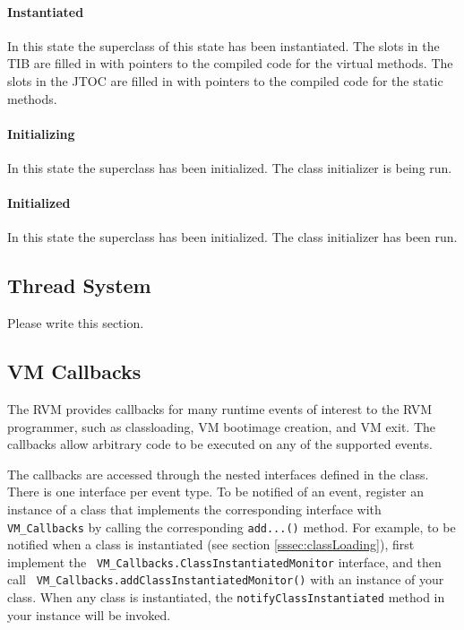 \paragraph{Instantiated}
In this state the superclass of this state has been instantiated. 
The slots in the TIB are filled in with pointers to the compiled code for the 
virtual methods. 
The slots in the JTOC are filled in with pointers to the compiled code for the 
static methods.

\paragraph{Initializing} 
In this state the superclass has been initialized. The class
initializer is being run. 

\paragraph{Initialized} 
In this state the superclass has been initialized. The class initializer has 
been run. 

\subsection{Thread System}\label{sec:threads}

Please write this section.

\subsection{VM Callbacks}\label{sssec:callbacks}

The RVM provides callbacks for many runtime events of interest to the RVM
programmer, such as classloading, VM bootimage creation, and VM exit.  The
callbacks allow arbitrary code to be executed on any of the supported events.

The callbacks are accessed through the nested interfaces defined in the 
class.  There is one interface per event type.  To be notified
of an event, register an instance of a class that implements the corresponding
interface with {\tt VM\_Callbacks} by calling the corresponding {\tt add...()}
method.  For example, to be notified when a class is instantiated (see section
\ref{sssec:classLoading}), first implement the {\tt
VM\_Callbacks.ClassInstantiatedMonitor} interface, and then call {\tt
VM\_Callbacks.addClassInstantiatedMonitor()} with an instance of your class.
When any class is instantiated, the {\tt notifyClassInstantiated} method in
your instance will be invoked.

